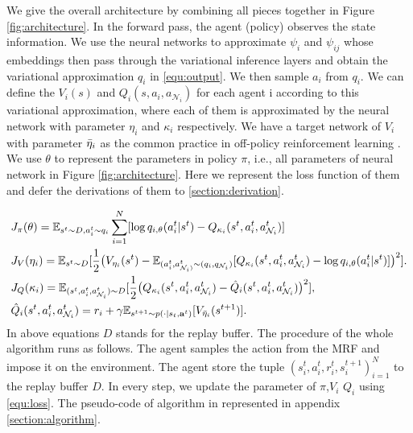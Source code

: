 \documentclass[11pt,a4paper]{article}
\theoremstyle{definition}
\begin{document}
We give the overall architecture  by combining all pieces together in Figure \ref{fig:architecture}. In the forward pass, the agent (policy) observes the state information. We use the neural networks to approximate $\psi_i$ and $\psi_{ij}$  whose embeddings then pass through the variational inference layers and obtain the variational approximation $q_i$ in \eqref{equ:output}. We then sample $a_i$ from $q_i$. We can define the $V_i(s)$ and $Q_i(s,a_i,a_{\mathcal{N}_i})$ for each agent i according to this variational approximation, where each of them is approximated by the neural network with parameter $\eta_i$ and $\kappa_i$ respectively. We have a target network of $V_i$ with parameter $\Bar{\eta}_i$ as the common practice in off-policy reinforcement learning \cite{haarnoja2018softac}. We use $\theta$ to represent  the parameters in policy $\pi$, i.e., all parameters of neural network in Figure \ref{fig:architecture}.  Here we  represent the loss function of them  and defer the derivations of them to \ref{section:derivation}.









\begin{equation}\label{equ:loss}
\begin{split}
&J_\pi(\theta)= \mathbb{E}_{s^t\sim D, a_i^t\sim q_i} \sum_{i=1}^{N}[\log q_{i,\theta}(a^t_i|s^t)- Q_{\kappa_i}(s^t, a_i^t, a_{\mathcal{N}_i}^t)]\\
&J_V(\eta_i)=\mathbb{E}_{s^t\sim D}[\frac{1}{2}\big(V_{\eta_i}(s^t)-
\mathbb{E}_{(a_i^t,a^t_{\mathcal{N}_i)}\sim (q_i,q _{\mathcal{N}_i})}  [Q_{\kappa_i}(s^t,a_i^t,a^t_{\mathcal{N}_i} )-\log q_{i,\theta}(a_i^t|s^t)]  \big)^2 ].\\  &J_Q(\kappa_i)=\mathbb{E}_{(s^t,a_i^t,a^t_{\mathcal{N}_i})\sim D} [\frac{1}{2}\big( Q_{\kappa_i}(s^t,a_i^t, a_{\mathcal{N}_i}^t)-\hat{Q}_i(s^t, a_i^t,a_{\mathcal{N}_i}^t) \big)^2],\\
&\hat{Q}_i(s^t,a_i^t, a^t_{\mathcal{N}_i})=r_i+\gamma \mathbb{E}_{s^{t+1}\sim p(\cdot|s_t,\mathbf{a}^t)}[V_{\Bar{\eta}_i}(s^{t+1})].\\
\end{split}
\end{equation}
In above equations $D$ stands for the replay buffer. The procedure of the whole algorithm runs as follows. The agent samples the action from the MRF  and impose it on the environment. The agent store the tuple $(s_i^t,a_i^t,r_i^t,s_i^{t+1})_{i=1}^N$ to the replay buffer $D$. In every step, we update the parameter of $\pi$,$V_i$ $Q_i$ using \eqref{equ:loss}. The pseudo-code of  algorithm in represented in appendix \ref{section:algorithm}.
\end{document}
